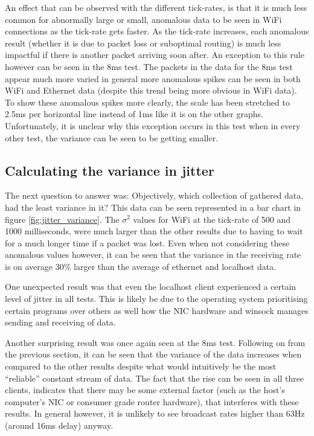 An effect that can be observed with the different tick-rates, is that it is much less common for abnormally large or small, anomalous data to be seen in WiFi connections as the tick-rate gets faster. As the tick-rate increases, each anomalous result (whether it is due to packet loss or suboptimal routing) is much less impactful if there is another packet arriving soon after. An exception to this rule however can be seen in the 8ms test. The packets in the data for the 8ms test appear much more varied in general more anomalous spikes can be seen in both WiFi and Ethernet data (despite this trend being more obvious in WiFi data). To show these anomalous spikes more clearly, the scale has been stretched to 2.5ms per horizontal line instead of 1ms like it is on the other graphs. Unfortunately, it is unclear why this exception occurs in this test when in every other test, the variance can be seen to be getting smaller.

\newpage



\subsection{Calculating the variance in jitter}\label{sec:variance_results}
The next question to answer was: Objectively, which collection of gathered data, had the least variance in it? This data can be seen represented in a bar chart in figure \ref{fig:jitter_variance}. The $\sigma^2$ values for WiFi at the tick-rate of 500 and 1000 milliseconds, were much larger than the other results due to having to wait for a much longer time if a packet was lost. Even when not considering these anomalous values however, it can be seen that the variance in the receiving rate is on average 30\% larger than the average of ethernet and localhost data.

One unexpected result was that even the localhost client experienced a certain level of jitter in all tests. This is likely be due to the operating system prioritising certain programs over others as well how the NIC hardware and winsock manages sending and receiving of data.

Another surprising result was once again seen at the 8ms test. Following on from the previous section, it can be seen that the variance of the data increases when compared to the other results despite what would intuitively be the most ``reliable'' constant stream of data. The fact that the rise can be seen in all three clients, indicates that there may be some external factor (such as the host's computer's NIC or consumer grade router hardware), that interferes with these results. In general however, it is unlikely to see broadcast rates higher than 63Hz (around 16ms delay) anyway.

